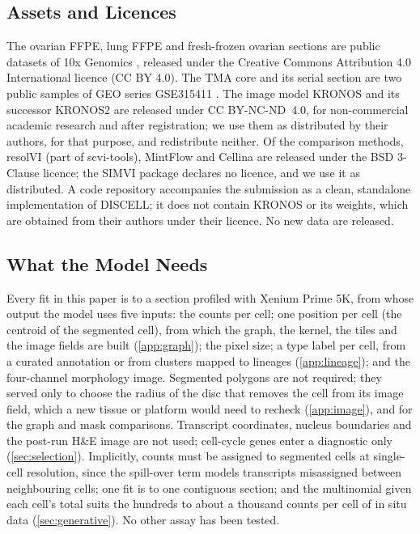 



\subsection{Assets and Licences}
\label{app:assets}

The ovarian FFPE, lung FFPE and fresh-frozen ovarian sections are public datasets of 10x Genomics \citep{tenx_ovarian_ffpe,tenx_lung_ffpe,tenx_ovary_ff}, released under the Creative Commons Attribution 4.0 International licence (CC BY 4.0). The TMA core and its serial section are two public samples of GEO series GSE315411 \citep{williamskatek2026fishing}. The image model KRONOS and its successor KRONOS2 \citep{kronos2025} are released under CC BY-NC-ND~4.0, for non-commercial academic research and after registration; we use them as distributed by their authors, for that purpose, and redistribute neither. %
Of the comparison methods, resolVI (part of scvi-tools), MintFlow and Cellina are released under the BSD 3-Clause licence; the SIMVI package declares no licence, and we use it as distributed. A code repository accompanies the submission as a clean, standalone implementation of DISCELL; it does not contain KRONOS or its weights, which are obtained from their authors under their licence. No new data are released.

\subsection{What the Model Needs}
\label{app:inputs}

Every fit in this paper is to a section profiled with Xenium Prime 5K, from whose output the model uses five inputs: the counts per cell; one position per cell (the centroid of the segmented cell), from which the graph, the kernel, the tiles and the image fields are built (\cref{app:graph}); the pixel size; a type label per cell, from a curated annotation or from clusters mapped to lineages (\cref{app:lineage}); and the four-channel morphology image. Segmented polygons are not required; they served only to choose the radius of the disc that removes the cell from its image field, which a new tissue or platform would need to recheck (\cref{app:image}), and for the graph and mask comparisons. Transcript coordinates, nucleus boundaries and the post-run H\&E image are not used; cell-cycle genes enter a diagnostic only (\cref{sec:selection}). Implicitly, counts must be assigned to segmented cells at single-cell resolution, since the spill-over term models transcripts misassigned between neighbouring cells; one fit is to one contiguous section; and the multinomial given each cell's total suits the hundreds to about a thousand counts per cell of in situ data (\cref{sec:generative}). No other assay has been tested.

